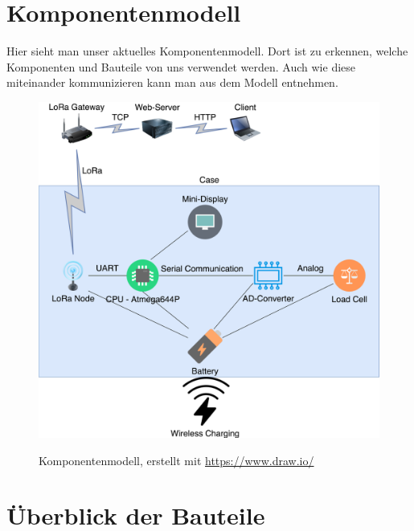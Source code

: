 \chapter{Komponentenmodell}
Hier sieht man unser aktuelles Komponentenmodell. Dort ist zu erkennen, welche Komponenten und Bauteile von uns verwendet werden. Auch wie diese miteinander kommunizieren kann man aus dem Modell entnehmen. 
\begin{figure}[ht]
    \center
    \includegraphics[width=15cm]{Bilder/komponentenmodell.png}\\
    \caption{Komponentenmodell, erstellt mit \url{https://www.draw.io/}}
    \label{fig:Komponentenmodell}
\end{figure}

\chapter{Überblick der Bauteile}
